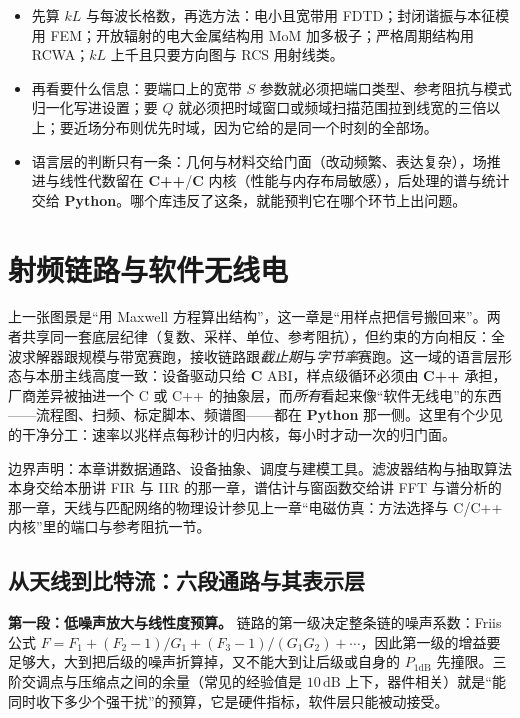 \documentclass[12pt,a4paper,fontset=fandol]{ctexbook}
\newcommand{\Bk}{\allowbreak}
\newcommand{\Lang}[1]{\textsf{\bfseries #1}}
\newcommand{\CL}{\Lang{C}}
\newcommand{\CPP}{\Lang{C++}}
\newcommand{\PY}{\Lang{Python}}
\begin{document}
\begin{guideline}[title={本章的选型口径}]
\begin{itemize}
\item 先算 $kL$ 与每波长格数，再选方法：电小且宽带用 FDTD；封闭谐振与本征模用 FEM；开放辐射的电大金属结构用 MoM 加多极子；严格周期结构用 RCWA；$kL$ 上千且只要方向图与 RCS 用射线类。
\item 再看要什么信息：要端口上的宽带 $S$ 参数就必须把端口类型、参考阻抗与模式归一化写进设置；要 $Q$ 就必须把时域窗口或频域扫描范围拉到线宽的三倍以上；要近场分布则优先时域，因为它给的是同一个时刻的全部场。
\item 语言层的判断只有一条：几何与材料交给门面（改动频繁、表达复杂），场推进与线性代数留在 \CPP{}/{\Bk}\CL{} 内核（性能与内存布局敏感），后处理的谱与统计交给 \PY{}。哪个库违反了这条，就能预判它在哪个环节上出问题。
\end{itemize}
\end{guideline}

\chapter{射频链路与软件无线电}

上一张图景是``用 Maxwell 方程算出结构''，这一章是``用样点把信号搬回来''。两者共享同一套底层纪律（复数、采样、单位、参考阻抗），但约束的方向相反：全波求解器跟规模与带宽赛跑，接收链路跟\emph{截止期}与\emph{字节率}赛跑。这一域的语言层形态与本册主线高度一致：设备驱动只给 \CL{} ABI，样点级循环必须由 \CPP{} 承担，厂商差异被抽进一个 C 或 C++ 的抽象层，而\emph{所有}看起来像``软件无线电''的东西——流程图、扫频、标定脚本、频谱图——都在 \PY{} 那一侧。这里有个少见的干净分工：速率以兆样点每秒计的归内核，每小时才动一次的归门面。

边界声明：本章讲数据通路、设备抽象、调度与建模工具。滤波器结构与抽取算法本身交给本册讲 FIR 与 IIR 的那一章，谱估计与窗函数交给讲 FFT 与谱分析的那一章，天线与匹配网络的物理设计参见上一章``电磁仿真：方法选择与 C/C++ 内核''里的端口与参考阻抗一节。

\section{从天线到比特流：六段通路与其表示层}

\textbf{第一段：低噪声放大与线性度预算。} 链路的第一级决定整条链的噪声系数：Friis 公式 $F = F_1 + (F_2 - 1)/G_1 + (F_3 - 1)/(G_1 G_2) + \cdots$，因此第一级的增益要足够大，大到把后级的噪声折算掉，又不能大到让后级或自身的 $P_{1\text{dB}}$ 先撞限。三阶交调点与压缩点之间的余量（常见的经验值是 $10\,\text{dB}$ 上下，器件相关）就是``能同时收下多少个强干扰''的预算，它是硬件指标，软件层只能被动接受。
\end{document}
